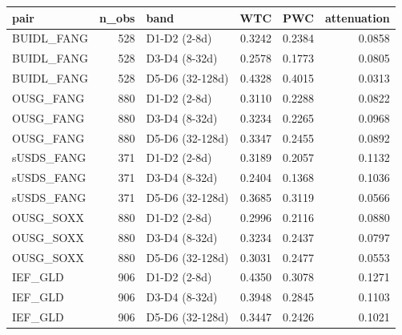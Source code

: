 \begin{tabular}{lrlrrr}
\toprule
pair & n\_obs & band & WTC & PWC & attenuation \\
\midrule
BUIDL\_FANG & 528 & D1-D2 (2-8d) & 0.3242 & 0.2384 & 0.0858 \\
BUIDL\_FANG & 528 & D3-D4 (8-32d) & 0.2578 & 0.1773 & 0.0805 \\
BUIDL\_FANG & 528 & D5-D6 (32-128d) & 0.4328 & 0.4015 & 0.0313 \\
OUSG\_FANG & 880 & D1-D2 (2-8d) & 0.3110 & 0.2288 & 0.0822 \\
OUSG\_FANG & 880 & D3-D4 (8-32d) & 0.3234 & 0.2265 & 0.0968 \\
OUSG\_FANG & 880 & D5-D6 (32-128d) & 0.3347 & 0.2455 & 0.0892 \\
sUSDS\_FANG & 371 & D1-D2 (2-8d) & 0.3189 & 0.2057 & 0.1132 \\
sUSDS\_FANG & 371 & D3-D4 (8-32d) & 0.2404 & 0.1368 & 0.1036 \\
sUSDS\_FANG & 371 & D5-D6 (32-128d) & 0.3685 & 0.3119 & 0.0566 \\
OUSG\_SOXX & 880 & D1-D2 (2-8d) & 0.2996 & 0.2116 & 0.0880 \\
OUSG\_SOXX & 880 & D3-D4 (8-32d) & 0.3234 & 0.2437 & 0.0797 \\
OUSG\_SOXX & 880 & D5-D6 (32-128d) & 0.3031 & 0.2477 & 0.0553 \\
IEF\_GLD & 906 & D1-D2 (2-8d) & 0.4350 & 0.3078 & 0.1271 \\
IEF\_GLD & 906 & D3-D4 (8-32d) & 0.3948 & 0.2845 & 0.1103 \\
IEF\_GLD & 906 & D5-D6 (32-128d) & 0.3447 & 0.2426 & 0.1021 \\
\bottomrule
\end{tabular}
